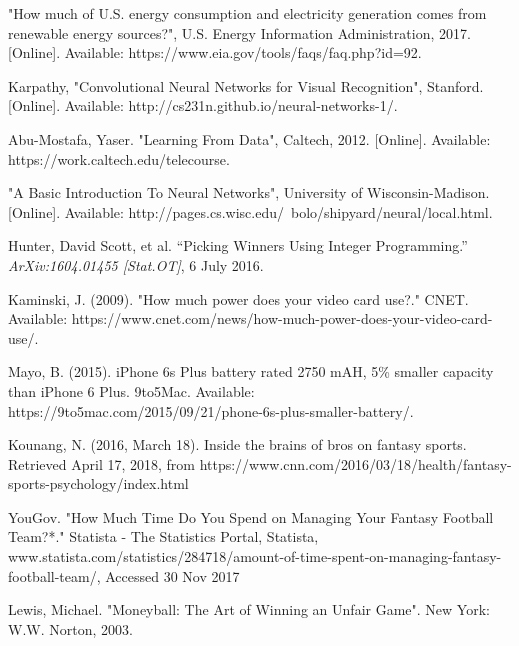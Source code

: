 \begin{thebibliography}{9}
"How much of U.S. energy consumption and electricity generation comes from renewable energy sources?", U.S. Energy Information Administration, 2017. [Online]. Available: https://www.eia.gov/tools/faqs/faq.php?id=92.

Karpathy, "Convolutional Neural Networks for Visual Recognition", Stanford. [Online]. Available: http://cs231n.github.io/neural-networks-1/.

Abu-Mostafa, Yaser. "Learning From Data", Caltech, 2012. [Online]. Available: https://work.caltech.edu/telecourse.

"A Basic Introduction To Neural Networks", University of Wisconsin-Madison. [Online]. Available: http://pages.cs.wisc.edu/~bolo/shipyard/neural/local.html.


Hunter, David Scott, et al. “Picking Winners Using Integer Programming.” \textit{ArXiv:1604.01455 [Stat.OT]}, 6 July 2016.

Kaminski, J. (2009). "How much power does your video card use?." CNET. Available: https://www.cnet.com/news/how-much-power-does-your-video-card-use/.

Mayo, B. (2015). iPhone 6s Plus battery rated 2750 mAH, 5\% smaller capacity than iPhone 6 Plus. 9to5Mac. Available: https://9to5mac.com/2015/09/21/phone-6s-plus-smaller-battery/.

Kounang, N. (2016, March 18). Inside the brains of bros on fantasy sports. Retrieved April 17, 2018, from https://www.cnn.com/2016/03/18/health/fantasy-sports-psychology/index.html

YouGov. "How Much Time Do You Spend on Managing Your Fantasy Football Team?*." Statista - The Statistics Portal, Statista, www.statista.com/statistics/284718/amount-of-time-spent-on-managing-fantasy-football-team/, Accessed 30 Nov 2017

Lewis, Michael. "Moneyball: The Art of Winning an Unfair Game". New York: W.W. Norton, 2003.

\end{thebibliography}
